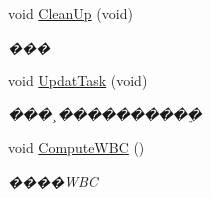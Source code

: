 \begin{DoxyCompactItemize}
void \hyperlink{classquadruped_1_1WBC__Ctrl_a62a3b0540468fe71fc60e7347437ff91}{Clean\+Up} (void)
\begin{DoxyCompactList}\small\item\em ��� \end{DoxyCompactList}\item 
void \hyperlink{classquadruped_1_1WBC__Ctrl_ac486930d16b7d44f10b86ad67ef76770}{Updat\+Task} (void)
\begin{DoxyCompactList}\small\item\em ���¸����������ֵ \end{DoxyCompactList}\item 
void \hyperlink{classquadruped_1_1WBC__Ctrl_a32ecf21e6375af82593f87f75e2405e4}{Compute\+W\+BC} ()
\begin{DoxyCompactList}\small\item\em ����\+W\+BC \end{DoxyCompactList}\end{DoxyCompactItemize}
